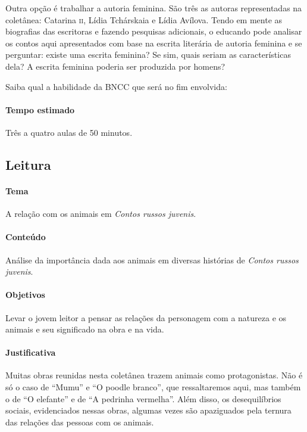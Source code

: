 \documentclass[11pt]{extarticle}
\begin{document}

Outra opção é trabalhar a autoria feminina. São três as autoras
representadas na coletânea: Catarina \textsc{ii}, Lídia Tchárskaia e Lídia
Avílova. Tendo em mente as biografias das escritoras e fazendo pesquisas
adicionais, o educando pode analisar os contos aqui apresentados com
base na escrita literária de autoria feminina e se perguntar: existe uma
escrita feminina? Se sim, quais seriam as características dela? A
escrita feminina poderia ser produzida por homens?

Saiba qual a habilidade da BNCC que será no fim envolvida:

\paragraph{Tempo estimado} Três a quatro aulas de 50 minutos.

\subsection{Leitura}

\paragraph{Tema} A relação com os animais em \emph{Contos russos juvenis}.

\paragraph{Conteúdo}
Análise da importância dada aos animais em diversas histórias de
\emph{Contos russos juvenis}.

\paragraph{Objetivos}
Levar o jovem leitor a pensar as relações da personagem com a natureza e
os animais e seu significado na obra e na vida.

\paragraph{Justificativa}
Muitas obras reunidas nesta coletânea trazem animais como protagonistas.
Não é só o caso de ``Mumu'' e ``O poodle branco'', que ressaltaremos aqui,
mas também o de ``O elefante'' e de ``A pedrinha vermelha''. Além
disso, os desequilíbrios sociais, evidenciados nessas obras, algumas
vezes são apaziguados pela ternura das relações das pessoas com os
animais.
\end{document}
